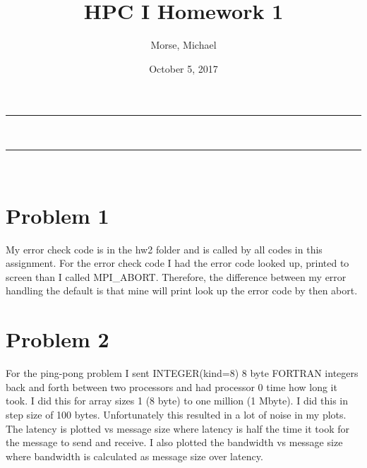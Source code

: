 \documentclass[12pt]{article}
\title{HPC I Homework 1}
\author{Morse, Michael}
\date{October 5, 2017}
\makeatletter
\newcommand{\nline}{\rule{\linewidth}{0.5pt}}
\theoremstyle{plain}
\theoremstyle{definition}
\renewcommand{\maketitle}{
\begin{center}
\nline\\
\vspace{2ex}
{\huge \textsc{\@title}}
\nline\\
{\large\textsc{\@author \hfill \@date}}
\vspace{4ex}
\end{center}
}
\makeatother
\begin{document}
\maketitle
\newpage

\section*{Problem 1}
My error check code is in the hw2 folder and is called by all codes in this assignment. For the error check code I had the error code looked up, printed to screen than I called MPI\_ABORT. Therefore, the difference between my error handling the default is that mine will print look up the error code by then abort.
\section*{Problem 2}
For the ping-pong problem I sent INTEGER(kind=8) 8 byte FORTRAN integers back and forth between two processors and had processor 0 time how long it took. I did this for array sizes 1 (8 byte) to one million (1 Mbyte). I did this in step size of 100 bytes. Unfortunately this resulted in a lot of noise in my plots. The latency is plotted vs message size where latency is half the time it took for the message to send and receive. I also plotted the bandwidth vs message size where bandwidth is calculated as message size over latency.  
\end{document}
